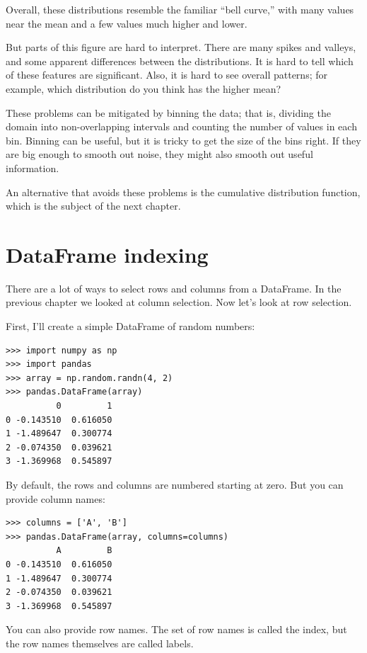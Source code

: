 \documentclass[12pt]{book}
\begin{document}
Overall, these distributions resemble the familiar ``bell curve,'' with
many values near the mean and a few values much higher and lower.

But parts of this figure are hard to interpret.  There are many spikes
and valleys, and some apparent differences between the distributions.
It is hard to tell which of these features are significant.  Also, it
is hard to see overall patterns; for example, which distribution do
you think has the higher mean?

These problems can be mitigated by binning the data;
that is, dividing the domain into non-overlapping intervals and counting
the number of values in each bin.  Binning can be useful, but it is
tricky to get the size of the bins right.  If they are big enough to
smooth out noise, they might also smooth out useful information.

An alternative that avoids these problems is the cumulative
distribution function, which is the subject of
the next chapter.


\section{DataFrame indexing}

There are a lot of ways to select rows and columns from a DataFrame.
In the previous chapter we looked at column selection.  Now let's
look at row selection.

First, I'll create a simple DataFrame of random numbers:

\begin{verbatim}
>>> import numpy as np
>>> import pandas
>>> array = np.random.randn(4, 2)
>>> pandas.DataFrame(array)
          0         1
0 -0.143510  0.616050
1 -1.489647  0.300774
2 -0.074350  0.039621
3 -1.369968  0.545897
\end{verbatim}

By default, the rows and columns are numbered starting at zero.
But you can provide column names:

\begin{verbatim}
>>> columns = ['A', 'B']
>>> pandas.DataFrame(array, columns=columns)
          A         B
0 -0.143510  0.616050
1 -1.489647  0.300774
2 -0.074350  0.039621
3 -1.369968  0.545897
\end{verbatim}

You can also provide row names.  The set of row names is called the
index, but the row names themselves are called labels.
\end{document}
